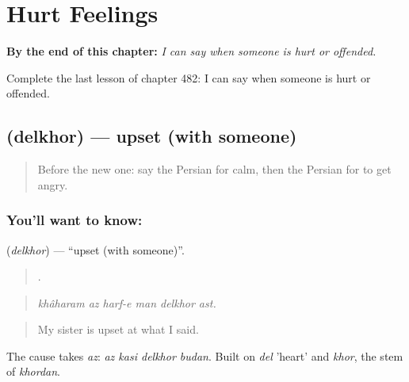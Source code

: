 
\chapter{Hurt Feelings}
\label{ch:fa-hurt-feelings}

\begin{chapteropening}
\textbf{By the end of this chapter:} \emph{I can say when someone is hurt or offended.}

Complete the last lesson of chapter 482: I can say when someone is hurt or offended.
\end{chapteropening}

\section[\texorpdfstring{\fa{دلخور} (delkhor)}{دلخور (delkhor)}]{ (delkhor) — upset (with someone)}

\label{lesson:FA-C482-delkhor}



\begin{quote}
Before the new one: say the Persian for calm, then the Persian for to get angry.
\end{quote}

\subsection*{You'll want to know: }
\textbf{} (\emph{delkhor}) — \textquotedblleft{}upset (with someone)\textquotedblright{}.

\begin{quote}
     .
\end{quote}

\begin{quote}
\emph{khâharam az harf-e man delkhor ast.}
\end{quote}

\begin{quote}
My sister is upset at what I said.
\end{quote}

The cause takes \emph{az}: \emph{az kasi delkhor budan}. Built on \emph{del} 'heart' and \emph{khor}, the stem of \emph{khordan}.

